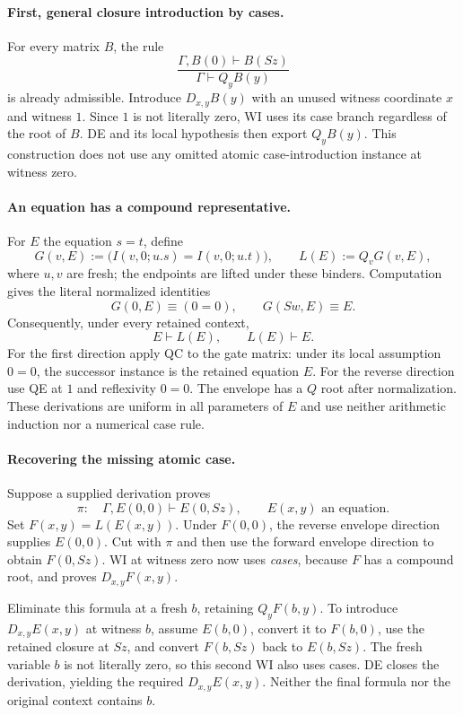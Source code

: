 \documentclass[11pt,letterpaper]{article}
\theoremstyle{definition}
\theoremstyle{remark}
\begin{document}
\paragraph{First, general closure introduction by cases.}
For every matrix $B$, the rule
\[
 \frac{\Gamma,B(0)\vdash B(Sz)}{\Gamma\vdash Q_yB(y)}
 \tag{QC}\label{env:qc}
\]
is already admissible. Introduce $D_{x,y}B(y)$ with an unused witness
coordinate $x$ and witness $1$. Since $1$ is not literally zero, WI uses
its case branch regardless of the root of $B$. DE and its local hypothesis
then export $Q_yB(y)$. This construction does not use any omitted atomic
case-introduction instance at witness zero.

\paragraph{An equation has a compound representative.}
For $E$ the equation $s=t$, define
\[
 G(v,E):=\bigl(I(v,0;u.s)=I(v,0;u.t)\bigr),\qquad
 L(E):=Q_vG(v,E),
 \tag{Envelope}\label{env:lift}
\]
where $u,v$ are fresh; the endpoints are lifted under these binders.
Computation gives the literal normalized identities
\[
 G(0,E)\equiv(0=0),\qquad G(Sw,E)\equiv E.
\]
Consequently, under every retained context,
\[
 E\vdash L(E),\qquad L(E)\vdash E.
 \tag{Envelope equivalence}\label{env:equiv}
\]
For the first direction apply QC to the gate matrix: under its local
assumption $0=0$, the successor instance is the retained equation $E$.
For the reverse direction use QE at $1$ and reflexivity $0=0$.
The envelope has a $Q$ root after normalization. These derivations are
uniform in all parameters of $E$ and use neither arithmetic induction
nor a numerical case rule.

\paragraph{Recovering the missing atomic case.}
Suppose a supplied derivation proves
\[
 \pi:\quad\Gamma,E(0,0)\vdash E(0,Sz),
 \qquad E(x,y)\text{ an equation}.
\]
Set $F(x,y)=L(E(x,y))$. Under $F(0,0)$, the reverse envelope direction
supplies $E(0,0)$. Cut with $\pi$ and then use the forward envelope
direction to obtain $F(0,Sz)$. WI at witness zero now uses \emph{cases},
because $F$ has a compound root, and proves $D_{x,y}F(x,y)$.

Eliminate this formula at a fresh $b$, retaining $Q_yF(b,y)$. To introduce
$D_{x,y}E(x,y)$ at witness $b$, assume $E(b,0)$, convert it to $F(b,0)$,
use the retained closure at $Sz$, and convert $F(b,Sz)$ back to
$E(b,Sz)$. The fresh variable $b$ is not literally zero, so this second
WI also uses cases. DE closes the derivation, yielding the required
$D_{x,y}E(x,y)$. Neither the final formula nor the original context contains
$b$.
\end{document}
